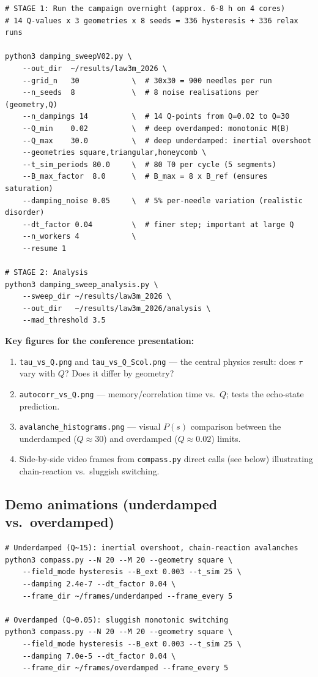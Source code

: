 \documentclass[11pt,a4paper]{article}
\newcommand{\file}[1]{\texttt{#1}}
\begin{document}
\begin{lstlisting}
# STAGE 1: Run the campaign overnight (approx. 6-8 h on 4 cores)
# 14 Q-values x 3 geometries x 8 seeds = 336 hysteresis + 336 relax runs

python3 damping_sweepV02.py \
    --out_dir  ~/results/law3m_2026 \
    --grid_n   30            \  # 30x30 = 900 needles per run
    --n_seeds  8             \  # 8 noise realisations per (geometry,Q)
    --n_dampings 14          \  # 14 Q-points from Q=0.02 to Q=30
    --Q_min    0.02          \  # deep overdamped: monotonic M(B)
    --Q_max    30.0          \  # deep underdamped: inertial overshoot
    --geometries square,triangular,honeycomb \
    --t_sim_periods 80.0     \  # 80 T0 per cycle (5 segments)
    --B_max_factor  8.0      \  # B_max = 8 x B_ref (ensures saturation)
    --damping_noise 0.05     \  # 5% per-needle variation (realistic disorder)
    --dt_factor 0.04         \  # finer step; important at large Q
    --n_workers 4            \
    --resume 1

# STAGE 2: Analysis
python3 damping_sweep_analysis.py \
    --sweep_dir ~/results/law3m_2026 \
    --out_dir   ~/results/law3m_2026/analysis \
    --mad_threshold 3.5
\end{lstlisting}

\medskip
\noindent\textbf{Key figures for the conference presentation:}
\begin{enumerate}
  \item \file{tau\_vs\_Q.png} and \file{tau\_vs\_Q\_Scol.png} ---
    the central physics result: does $\tau$ vary with $Q$? Does it differ
    by geometry?
  \item \file{autocorr\_vs\_Q.png} --- memory/correlation time vs.\ $Q$;
    tests the echo-state prediction.
  \item \file{avalanche\_histograms.png} --- visual $P(s)$ comparison between
    the underdamped ($Q \approx 30$) and overdamped ($Q \approx 0.02$) limits.
  \item Side-by-side video frames from \texttt{compass.py} direct calls (see
    below) illustrating chain-reaction vs.\ sluggish switching.
\end{enumerate}

\subsection{Demo animations (underdamped vs.\ overdamped)}

\begin{lstlisting}
# Underdamped (Q~15): inertial overshoot, chain-reaction avalanches
python3 compass.py --N 20 --M 20 --geometry square \
    --field_mode hysteresis --B_ext 0.003 --t_sim 25 \
    --damping 2.4e-7 --dt_factor 0.04 \
    --frame_dir ~/frames/underdamped --frame_every 5

# Overdamped (Q~0.05): sluggish monotonic switching
python3 compass.py --N 20 --M 20 --geometry square \
    --field_mode hysteresis --B_ext 0.003 --t_sim 25 \
    --damping 7.0e-5 --dt_factor 0.04 \
    --frame_dir ~/frames/overdamped --frame_every 5
\end{lstlisting}
\end{document}
